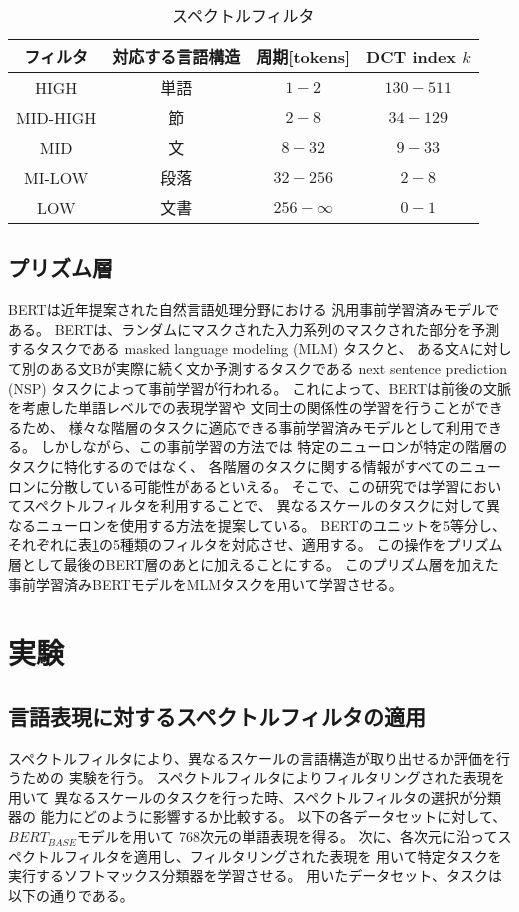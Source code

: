\documentclass{jsarticle}
\begin{document}
\begin{table}[H]
  \begin{center}
    \caption{スペクトルフィルタ}
    \begin{tabular}{cccc} \hline
      フィルタ  & 対応する言語構造 & 周期[tokens] & DCT index $k$  \\ \hline 
      HIGH     & 単語 & $1-2$        & $130 - 511$    \\
      MID-HIGH & 節   & $2-8$        & $34 - 129$  \\
      MID      & 文   & $8-32$       & $9 - 33$  \\ 
      MI-LOW   & 段落 & $32-256$     & $2 - 8$ \\
      LOW      & 文書 & $256-\infty$ & $0 - 1$ 
      \\ \hline
    \end{tabular}
    \label{tab:tab1}
  \end{center}
\end{table}

\subsection{プリズム層}
BERT\cite{devlin2019bert}は近年提案された自然言語処理分野における
汎用事前学習済みモデルである。
BERTは、ランダムにマスクされた入力系列のマスクされた部分を予測するタスクである
masked language modeling (MLM) タスクと、
ある文Aに対して別のある文Bが実際に続く文か予測するタスクである
next sentence prediction (NSP) タスクによって事前学習が行われる。
これによって、BERTは前後の文脈を考慮した単語レベルでの表現学習や
文同士の関係性の学習を行うことができるため、
様々な階層のタスクに適応できる事前学習済みモデルとして利用できる。
しかしながら、この事前学習の方法では
特定のニューロンが特定の階層のタスクに特化するのではなく、
各階層のタスクに関する情報がすべてのニューロンに分散している可能性があるといえる。
そこで、この研究では学習においてスペクトルフィルタを利用することで、
異なるスケールのタスクに対して異なるニューロンを使用する方法を提案している。
BERTのユニットを5等分し、それぞれに表\ref{tab:tab1}の5種類のフィルタを対応させ、適用する。
この操作をプリズム層として最後のBERT層のあとに加えることにする。
このプリズム層を加えた事前学習済みBERTモデルをMLMタスクを用いて学習させる。

\section{実験}
\subsection{言語表現に対するスペクトルフィルタの適用}
スペクトルフィルタにより、異なるスケールの言語構造が取り出せるか評価を行うための
実験を行う。
スペクトルフィルタによりフィルタリングされた表現を用いて
異なるスケールのタスクを行った時、スペクトルフィルタの選択が分類器の
能力にどのように影響するか比較する。
以下の各データセットに対して、$BERT_{BASE}$モデル\cite{devlin2019bert}を用いて
768次元の単語表現を得る。
次に、各次元に沿ってスペクトルフィルタを適用し、フィルタリングされた表現を
用いて特定タスクを実行するソフトマックス分類器を学習させる。
用いたデータセット、タスクは以下の通りである。
\end{document}
